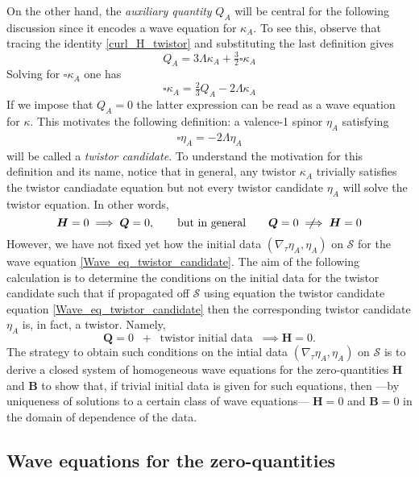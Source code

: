 \documentclass[10pt,a4paper]{article}
\theoremstyle{plain}
\def\bmB{{\bm B}}
\def\bmH{{\bm H}}
\def\bmQ{{\bm Q}}
\newcommand{\notimplies}{%
  \mathrel{{\ooalign{\hidewidth$\not\phantom{=}$\hidewidth\cr$\implies$}}}}
\begin{document}
{  On the other hand, the \emph{auxiliary quantity}
  $Q_A$ will be central for the following discussion since it
  encodes a wave equation for $\kappa_A$. To see this, observe that
  tracing the identity \eqref{curl_H_twistor} and substituting the
  last definition gives
\begin{equation}\label{Q_to_box_twistor_candidate}
Q_{A} = 3 \Lambda \kappa _{A} + \tfrac{3}{2} \square \kappa _{A}
\end{equation}
Solving for $\square \kappa _{A}$ one has
\[
\square \kappa _{A} = \tfrac{2}{3} Q_{A} -2 \Lambda \kappa _{A}
\]
If we impose that $Q_{A}=0$ the latter expression can be read as a wave equation for $\kappa$.
This motivates the following definition: a valence-1 spinor $\eta_A$ satisfying
\begin{align} \label{Wave_eq_twistor_candidate}
\square \eta _{A} = -2 \Lambda  \eta _{A}
\end{align}
will be called a \emph{twistor candidate}. To understand the
motivation for this definition and its name, notice that in general,
any twistor $\kappa_A$ trivially satisfies the twistor candiadate
equation but not every twistor candidate $\eta_A$ will solve the
twistor equation. In other words,
\[
\bmH=0 \implies \bmQ =0, \qquad \text{but in general} \qquad \bmQ =0 \notimplies \bmH=0
\]
However, we have not fixed yet how the initial data $(\nabla_\tau
\eta_A, \eta_A)$ on $\mathcal{S}$ for the wave equation
\eqref{Wave_eq_twistor_candidate}. The aim of the following
calculation is to determine the conditions on the initial data for the
twistor candidate such that if propagated off $\mathcal{S}$ using
equation the twistor candidate equation
\eqref{Wave_eq_twistor_candidate} then the corresponding twistor
candidate $\eta_A$ is, in fact, a twistor. Namely,
\begin{equation}
\bmQ =0 \;\;+\;\; \text{twistor initial data} \;\;\implies \bmH=0.
\end{equation}
The strategy to obtain such conditions on the intial data
$(\nabla_\tau \eta_A, \eta_A)$ on $\mathcal{S}$ is to derive a closed
system of homogeneous wave equations for the zero-quantities $\bmH$
and $\bmB$ to show that, if trivial initial data is given for such
equations, then ---by uniqueness of solutions to a certain class of wave
equations--- $\bmH=0$ and $\bmB=0$ in the domain of dependence of the data.

\subsection{Wave equations for the zero-quantities}

}
\end{document}
